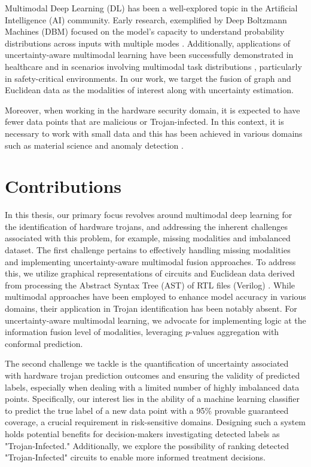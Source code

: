 Multimodal Deep Learning (DL) has been a well-explored topic in the Artificial Intelligence (AI) community. Early research, exemplified by Deep Boltzmann Machines (DBM) focused on the model's capacity to understand probability distributions across inputs with multiple modes \cite{srivastava2012multimodal}. Additionally, applications of uncertainty-aware multimodal learning \cite{wang2022uncertaintyaware} have been successfully demonstrated in healthcare \cite{sarawgi2021uncertainty} and in scenarios involving multimodal task distributions \cite{almecija2022uncertaintyaware}, particularly in safety-critical environments. In our work, we target the fusion of graph \cite{ektefaie2023multimodal, kim2023heterogeneous} and Euclidean data as the modalities of interest along with uncertainty estimation. 

Moreover, when working in the hardware security domain, it is expected to have fewer data points that are malicious or Trojan-infected. In this context, it is necessary to work with small data \cite{nyiri2023can} and this has been achieved in various domains such as material science \cite{xu2023small} and anomaly detection \cite{ghamisi2023anomaly}.

\section*{Contributions}
\label{Contribution}
In this thesis, our primary focus revolves around multimodal deep learning for the identification of hardware trojans, and addressing the inherent challenges associated with this problem, for example, missing modalities and imbalanced dataset. The first challenge pertains to effectively handling missing modalities and implementing uncertainty-aware multimodal fusion approaches. To address this, we utilize graphical representations of circuits \cite{yu2021hw2vec} and Euclidean data derived from processing the Abstract Syntax Tree (AST) of RTL files (Verilog) \cite{px6s-sm21-22}. While multimodal approaches have been employed to enhance model accuracy in various domains, their application in Trojan identification has been notably absent. For uncertainty-aware multimodal learning, we advocate for implementing logic at the information fusion level of modalities, leveraging $p$-values aggregation with conformal prediction.

The second challenge we tackle is the quantification of uncertainty associated with hardware trojan prediction outcomes and ensuring the validity of predicted labels, especially when dealing with a limited number of highly imbalanced data points. Specifically, our interest lies in the ability of a machine learning classifier to predict the true label of a new data point with a 95\% provable guaranteed coverage, a crucial requirement in risk-sensitive domains. Designing such a system holds potential benefits for decision-makers investigating detected labels as "Trojan-Infected." Additionally, we explore the possibility of ranking detected "Trojan-Infected" circuits to enable more informed treatment decisions.


